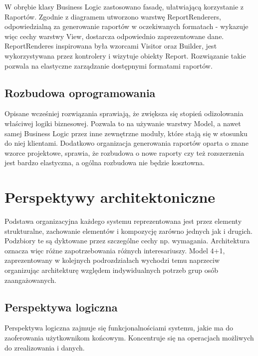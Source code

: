 W obrębie klasy Business Logic zastosowano fasadę, ułatwiającą korzystanie z Raportów. Zgodnie z diagramem utworzono warstwę ReportRenderers, odpowiedzialną za generowanie raportów w oczekiwanych formatach - wykazuje więc cechy warstwy View, dostarcza odpowiednio zaprezentowane dane. ReportRenderes inspirowana była wzorcami Visitor oraz Builder, jest wykorzystywana przez kontrolery i wizytuje obiekty Report. Rozwiązanie takie pozwala na elastyczne zarządzanie dostępnymi formatami raportów.

\subsection{Rozbudowa oprogramowania}

Opisane wcześniej rozwiązania sprawiają, że zwiększa się stopień odizolowania właściwej logiki biznesowej. Pozwala to na używanie warstwy Model, a nawet samej Business Logic przez inne zewnętrzne moduły, które stają się w stosunku do niej klientami. Dodatkowo organizacja generowania raportów oparta o znane wzorce projektowe, sprawia, że rozbudowa o nowe raporty czy też rozszerzenia jest bardzo elastyczna, a ogólna rozbudowa nie będzie kosztowna.

\section{Perspektywy architektoniczne}

Podstawa organizacyjna każdego systemu reprezentowana jest przez elementy strukturalne, zachowanie elementów i kompozycję zarówno jednych jak i drugich. Podzbiory te są dyktowane przez szczególne cechy np. wymagania. Architektura oznacza więc różne zapotrzebowania różnych interesariuszy. Model 4+1, zaprezentowany w kolejnych podrozdziałach wychodzi temu naprzeciw organizując architekturę względem indywidualnych potrzeb grup osób zaangażowanych.

\subsection{Perspektywa logiczna}

Perspektywa logiczna zajmuje się funkcjonalnościami systemu, jakie ma do zaoferowania użytkownikom końcowym. Koncentruje się na operacjach możliwych do zrealizowania i danych.

